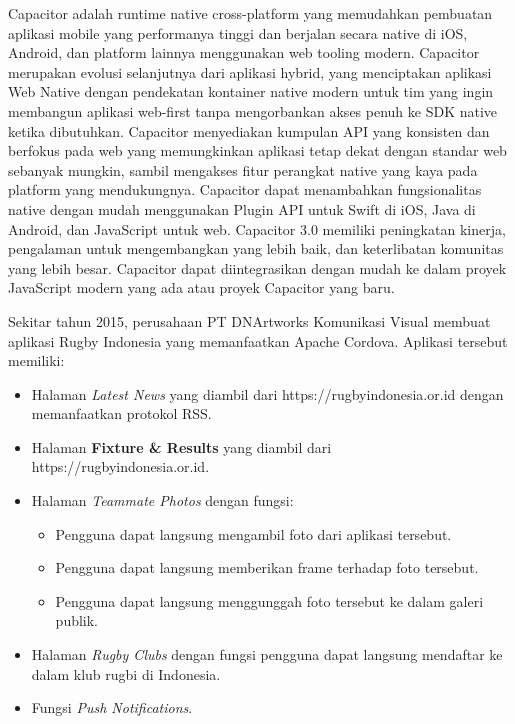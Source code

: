 \documentclass[a4paper,twoside]{article}
\begin{document}
Capacitor adalah runtime native cross-platform yang memudahkan pembuatan aplikasi mobile yang performanya tinggi dan berjalan secara native di iOS, Android, dan platform lainnya menggunakan web tooling modern. Capacitor merupakan evolusi selanjutnya dari aplikasi hybrid, yang menciptakan aplikasi Web Native dengan pendekatan kontainer native modern untuk tim yang ingin membangun aplikasi web-first tanpa mengorbankan akses penuh ke SDK native ketika dibutuhkan. Capacitor menyediakan kumpulan API yang konsisten dan berfokus pada web yang memungkinkan aplikasi tetap dekat dengan standar web sebanyak mungkin, sambil mengakses fitur perangkat native yang kaya pada platform yang mendukungnya. Capacitor dapat menambahkan fungsionalitas native dengan mudah menggunakan Plugin API untuk Swift di iOS, Java di Android, dan JavaScript untuk web. Capacitor 3.0 memiliki peningkatan kinerja, pengalaman untuk mengembangkan yang lebih baik, dan keterlibatan komunitas yang lebih besar. Capacitor dapat diintegrasikan dengan mudah ke dalam proyek JavaScript modern yang ada atau proyek Capacitor yang baru.

Sekitar tahun 2015, perusahaan PT DNArtworks Komunikasi Visual membuat aplikasi Rugby Indonesia yang memanfaatkan Apache Cordova. Aplikasi tersebut memiliki: 
\begin{itemize}
    \item Halaman \textit{Latest News} yang diambil dari https://rugbyindonesia.or.id dengan memanfaatkan protokol RSS.
    \item Halaman \textbf{Fixture \& Results} yang diambil dari https://rugbyindonesia.or.id.
    \item Halaman \textit{Teammate Photos} dengan fungsi:
    \begin{itemize}
        \item Pengguna dapat langsung mengambil foto dari aplikasi tersebut.
        \item Pengguna dapat langsung memberikan frame terhadap foto tersebut.
        \item Pengguna dapat langsung menggunggah foto tersebut ke dalam galeri publik.
    \end{itemize}
    \item Halaman \textit{Rugby Clubs} dengan fungsi pengguna dapat langsung mendaftar ke dalam klub rugbi di Indonesia.
    \item Fungsi \textit{Push Notifications}.
\end{itemize}
\end{document}
